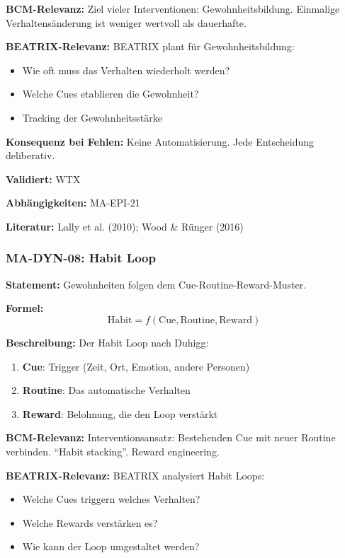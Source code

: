 \textbf{BCM-Relevanz:}
Ziel vieler Interventionen: Gewohnheitsbildung. Einmalige Verhaltensänderung ist weniger wertvoll als dauerhafte.

\textbf{BEATRIX-Relevanz:}
BEATRIX plant für Gewohnheitsbildung:
\begin{itemize}
    \item Wie oft muss das Verhalten wiederholt werden?
    \item Welche Cues etablieren die Gewohnheit?
    \item Tracking der Gewohnheitsstärke
\end{itemize}

\textbf{Konsequenz bei Fehlen:}
Keine Automatisierung. Jede Entscheidung deliberativ.

\textbf{Validiert:} WTX

\textbf{Abhängigkeiten:} MA-EPI-21

\textbf{Literatur:} Lally et al. (2010); Wood \& Rünger (2016)


\subsubsection*{MA-DYN-08: Habit Loop}

\textbf{Statement:} Gewohnheiten folgen dem Cue-Routine-Reward-Muster.

\textbf{Formel:}
\begin{equation}
\text{Habit} = f(\text{Cue}, \text{Routine}, \text{Reward})
\end{equation}

\textbf{Beschreibung:}
Der Habit Loop nach Duhigg:
\begin{enumerate}
    \item \textbf{Cue}: Trigger (Zeit, Ort, Emotion, andere Personen)
    \item \textbf{Routine}: Das automatische Verhalten
    \item \textbf{Reward}: Belohnung, die den Loop verstärkt
\end{enumerate}

\textbf{BCM-Relevanz:}
Interventionsansatz: Bestehenden Cue mit neuer Routine verbinden. ``Habit stacking''. Reward engineering.

\textbf{BEATRIX-Relevanz:}
BEATRIX analysiert Habit Loops:
\begin{itemize}
    \item Welche Cues triggern welches Verhalten?
    \item Welche Rewards verstärken es?
    \item Wie kann der Loop umgestaltet werden?
\end{itemize}


